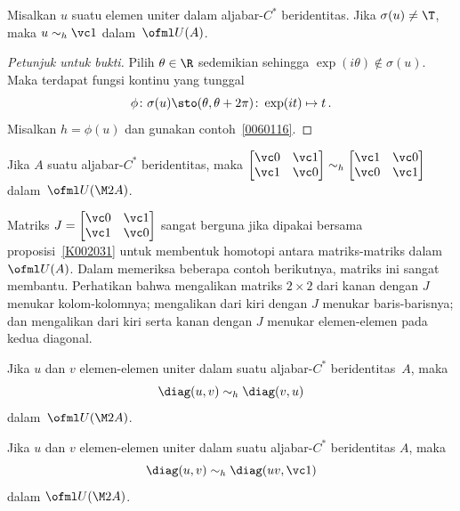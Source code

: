 \begin{prop}\label{0060121} Misalkan $u$ suatu elemen uniter dalam aljabar-$C^*$ beridentitas. Jika $\sigma(u) \ne \T$, maka $u \sim_h \vc 1$ dalam~$\ofml U(A)$.
\end{prop}

\begin{proof}[\emph{Petunjuk untuk bukti}] Pilih $\theta \in \R$ sedemikian sehingga $\exp(i\theta) \notin \sigma(u)$. Maka terdapat fungsi kontinu yang tunggal
   \[ \phi\colon \sigma(u) \sto (\theta, \theta + 2\pi)\colon \exp(it) \mapsto t\,. \]
Misalkan $h = \phi(u)$ dan gunakan contoh~\ref{0060116}.   \ns
\end{proof}

\begin{exam}\label{0060129a} Jika $A$ suatu aljabar-$C^*$ beridentitas, maka $\begin{bmatrix} \vc 0  &  \vc 1  \\  \vc 1  &  \vc 0  \end{bmatrix} \sim_h
\begin{bmatrix} \vc 1  &  \vc 0  \\ \vc 0  & \vc 1 \end{bmatrix}$ dalam~$\ofml U(\M 2A)$.
\end{exam}

Matriks $J = \begin{bmatrix} \vc 0  &  \vc 1  \\ \vc 1 & \vc 0 \end{bmatrix}$ sangat berguna jika dipakai bersama
proposisi~\ref{K002031} untuk membentuk homotopi antara matriks-matriks dalam $\ofml U(A)$. Dalam memeriksa beberapa contoh
berikutnya, matriks ini sangat membantu. Perhatikan bahwa mengalikan matriks $2 \times 2$ dari kanan dengan $J$ menukar kolom-kolomnya; mengalikan
dari kiri dengan $J$ menukar baris-barisnya; dan mengalikan dari kiri serta kanan dengan $J$ menukar elemen-elemen pada kedua diagonal.

\begin{exam}\label{0060129b} Jika $u$ dan $v$ elemen-elemen uniter dalam suatu aljabar-$C^*$ beridentitas~$A$, maka
   \[ \diag(u,v) \sim_h \diag(v,u) \]
dalam~$\ofml U(\M 2A)$.
\end{exam}

\begin{exam}\label{0060129c} Jika $u$ dan $v$ elemen-elemen uniter dalam suatu aljabar-$C^*$ beridentitas $A$, maka
  \[ \diag(u,v) \sim_h \diag(uv, \vc 1) \]
dalam $\ofml U(\M 2A)$.
\end{exam}

